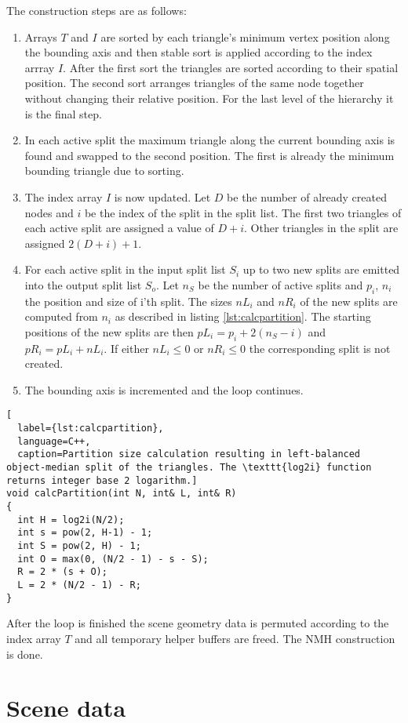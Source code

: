 The construction steps are as follows:
\begin{enumerate}
\item Arrays $T$ and $I$ are sorted by each triangle's minimum vertex position along the bounding axis and then stable sort is applied according to the index arrray $I$. After the first sort the triangles are sorted according to their spatial position. The second sort arranges triangles of the same node together without changing their relative position. For the last level of the hierarchy it is the final step.
\item In each active split the maximum triangle along the current bounding axis is found and swapped to the second position. The first is already the minimum bounding triangle due to sorting.
\item The index array $I$ is now updated. Let $D$ be the number of already created nodes and $i$ be the index of the split in the split list. The first two triangles of each active split are assigned a value of $D+i$. Other triangles in the split are assigned $2(D+i)+1$.
\item For each active split in the input split list $S_{i}$ up to two new splits are emitted into the output split list $S_{o}$. Let $n_{S}$ be the number of active splits and $p_{i}$, $n_{i}$ the position and size of i'th split. The sizes $nL_{i}$ and $nR_{i}$ of the new splits are computed from $n_{i}$ as described in listing \ref{lst:calcpartition}. The starting positions of the new splits are then $pL_{i} = p_{i} + 2(n_{S} - i)$ and $pR_{i} = pL_{i} + nL_{i}$. If either $nL_{i} \le 0$ or $nR_{i} \le 0$ the corresponding split is not created.
\item The bounding axis is incremented and the loop continues.
\end{enumerate}
\begin{lstlisting}[
  label={lst:calcpartition},
  language=C++,
  caption=Partition size calculation resulting in left-balanced object-median split of the triangles. The \texttt{log2i} function returns integer base 2 logarithm.]
void calcPartition(int N, int& L, int& R)
{
  int H = log2i(N/2);
  int s = pow(2, H-1) - 1;
  int S = pow(2, H) - 1;
  int O = max(0, (N/2 - 1) - s - S);
  R = 2 * (s + O);
  L = 2 * (N/2 - 1) - R;
}
\end{lstlisting}
After the loop is finished the scene geometry data is permuted according to the index array $T$ and all temporary helper buffers are freed. The NMH construction is done.

\section{Scene data}

